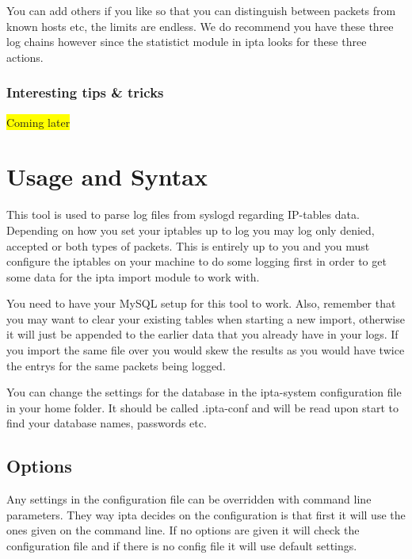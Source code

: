 \documentclass[english,twoside,openright,a4paper,12pt]{article}
\newcommand{\hilight}[1]{\colorbox{yellow}{#1}}
\begin{document}
You can add others if you like so that you can distinguish between
packets from known hosts etc, the limits are endless. We do recommend
you have these three log chains however since the statistict module in
ipta looks for these three actions.

\subsubsection{Interesting tips \& tricks}

\hilight{Coming later}


\section{Usage and Syntax}

This tool is used to parse log files from syslogd regarding IP-tables
data. Depending on how you set your iptables up to log you may log
only denied, accepted or both types of packets. This is entirely up to
you and you must configure the iptables on your machine to do some
logging first in order to get some data for the ipta import module to
work with.
 
You need to have your MySQL setup for this tool to work. Also,
remember that you may want to clear your existing tables when starting
a new import, otherwise it will just be appended to the earlier data
that you already have in your logs. If you import the same file over
you would skew the results as you would have twice the entrys for the
same packets being logged.
 
You can change the settings for the database in the ipta-system
configuration file in your home folder. It should be called .ipta-conf
and will be read upon start to find your database names, passwords
etc. 

\subsection{Options}

Any settings in the configuration file can be overridden with command
line parameters. They way ipta decides on the configuration is that
first it will use the ones given on the command line. If no options
are given it will check the configuration file and if there is no
config file it will use default settings.
\end{document}

